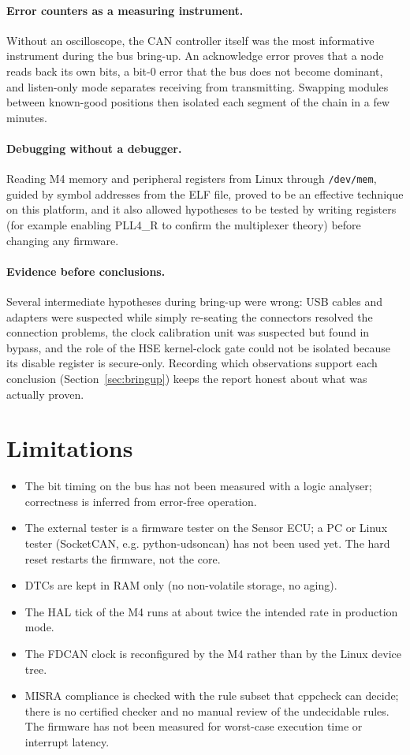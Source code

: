 \paragraph{Error counters as a measuring instrument.} Without an oscilloscope, the CAN controller itself was the most informative instrument during the bus bring-up. An acknowledge error proves that a node reads back its own bits, a bit-0 error that the bus does not become dominant, and listen-only mode separates receiving from transmitting. Swapping modules between known-good positions then isolated each segment of the chain in a few minutes.

\paragraph{Debugging without a debugger.} Reading M4 memory and peripheral registers from Linux through \texttt{/dev/mem}, guided by symbol addresses from the ELF file, proved to be an effective technique on this platform, and it also allowed hypotheses to be tested by writing registers (for example enabling PLL4\_R to confirm the multiplexer theory) before changing any firmware.

\paragraph{Evidence before conclusions.} Several intermediate hypotheses during bring-up were wrong: USB cables and adapters were suspected while simply re-seating the connectors resolved the connection problems, the clock calibration unit was suspected but found in bypass, and the role of the HSE kernel-clock gate could not be isolated because its disable register is secure-only. Recording which observations support each conclusion (Section~\ref{sec:bringup}) keeps the report honest about what was actually proven.

\section{Limitations}

\begin{itemize}
  \item The bit timing on the bus has not been measured with a logic analyser; correctness is inferred from error-free operation.
  \item The external tester is a firmware tester on the Sensor ECU; a PC or Linux tester (SocketCAN, e.g. python-udsoncan) has not been used yet. The hard reset restarts the firmware, not the core.
  \item DTCs are kept in RAM only (no non-volatile storage, no aging).
  \item The HAL tick of the M4 runs at about twice the intended rate in production mode.
  \item The FDCAN clock is reconfigured by the M4 rather than by the Linux device tree.
  \item MISRA compliance is checked with the rule subset that cppcheck can decide; there is no certified checker and no manual review of the undecidable rules. The firmware has not been measured for worst-case execution time or interrupt latency.
\end{itemize}
